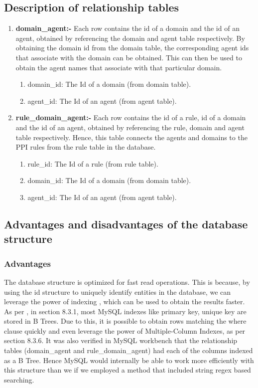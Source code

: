 \documentclass[msc,deptreport,ai]{infthesis}      %
\begin{document}
 \subsection{Description of  relationship tables}
\begin{enumerate}
	\item \textbf{domain\_agent:-} Each row contains the id of a domain and the id of an agent, obtained by referencing the domain and agent table respectively. 
	By obtaining the domain id from the domain table, the corresponding agent ids that associate with the domain can be obtained. This can then be used to obtain the agent names that associate with that particular domain.
	\begin{enumerate}
		\item domain\_id: The Id of a domain (from domain table).
		\item agent\_id: The Id of an agent (from agent table).
	\end{enumerate}

	\item \textbf{rule\_domain\_agent:-} Each row contains the id of a rule, id of a domain and the id of an agent, obtained by referencing the rule, domain and agent table respectively. Hence, this table connects the agents and domains to the PPI rules from the rule table in the database.
	\begin{enumerate}
		\item rule\_id: The Id of a rule (from rule table).
		\item domain\_id: The Id of a domain (from domain table).
		\item agent\_id: The Id of an agent (from agent table).
	\end{enumerate}
\end{enumerate}
 \subsection{Advantages and  disadvantages of the database structure}
 \subsubsection{Advantages}
The database structure is optimized for fast read operations. This is because, by using the id structure to uniquely identify entities in the database, we can leverage the power of indexing \cite{indexing}, which can be used to obtain the results faster. As per \cite{indexing}, in section 8.3.1, most MySQL indexes like primary key, unique key are stored in B Trees. Due to this, it is possible to obtain rows matching the where clause quickly and even leverage the power of Multiple-Column Indexes, as per \cite{indexing} section 8.3.6. It was also verified in MySQL workbench that the relationship tables (domain\_agent and rule\_domain\_agent) had each of the columns indexed as a B Tree. Hence MySQL would internally be able to work more efficiently with this structure than we if we employed a method that included string regex based searching.
\end{document}
